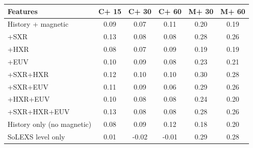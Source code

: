 \begin{tabular}{lccccc}
\toprule
Features & C+ 15 & C+ 30 & C+ 60 & M+ 30 & M+ 60 \\
\midrule
History + magnetic & 0.09 & 0.07 & 0.11 & 0.20 & 0.19 \\
+SXR & 0.13 & 0.08 & 0.08 & 0.28 & 0.26 \\
+HXR & 0.08 & 0.07 & 0.09 & 0.19 & 0.19 \\
+EUV & 0.10 & 0.09 & 0.08 & 0.23 & 0.21 \\
+SXR+HXR & 0.12 & 0.10 & 0.10 & 0.30 & 0.28 \\
+SXR+EUV & 0.11 & 0.09 & 0.06 & 0.29 & 0.26 \\
+HXR+EUV & 0.10 & 0.08 & 0.08 & 0.24 & 0.20 \\
+SXR+HXR+EUV & 0.13 & 0.08 & 0.08 & 0.28 & 0.26 \\
\midrule
History only (no magnetic) & 0.08 & 0.09 & 0.12 & 0.18 & 0.20 \\
SoLEXS level only & 0.01 & -0.02 & -0.01 & 0.29 & 0.28 \\
\bottomrule
\end{tabular}
